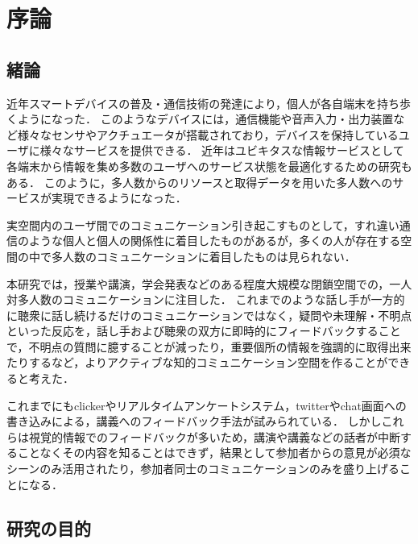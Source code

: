 \chapter{序論}


\section{緒論}





近年スマートデバイスの普及・通信技術の発達により，個人が各自端末を持ち歩くようになった．
このようなデバイスには，通信機能や音声入力・出力装置など様々なセンサやアクチュエータが搭載されており，デバイスを保持しているユーザに様々なサービスを提供できる．
近年はユビキタスな情報サービスとして各端末から情報を集め多数のユーザへのサービス状態を最適化するための研究もある\cite{11ubi}．
このように，多人数からのリソースと取得データを用いた多人数へのサービスが実現できるようになった．


実空間内のユーザ間でのコミュニケーション引き起こすものとして，すれ違い通信\cite{surechigai}のような個人と個人の関係性に着目したものがあるが，多くの人が存在する空間の中で多人数のコミュニケーションに着目したものは見られない．

本研究では，授業や講演，学会発表などのある程度大規模な閉鎖空間での，一人対多人数のコミュニケーションに注目した．
これまでのような話し手が一方的に聴衆に話し続けるだけのコミュニケーションではなく，疑問や未理解・不明点といった反応を，話し手および聴衆の双方に即時的にフィードバックすることで，不明点の質問に臆することが減ったり，重要個所の情報を強調的に取得出来たりするなど，よりアクティブな知的コミュニケーション空間を作ることができると考えた．

これまでにもclicker\cite{clicker}やリアルタイムアンケートシステム\cite{imakiku}，twitterやchat画面への書き込みによる\cite{twitter}，講義へのフィードバック手法が試みられている．
しかしこれらは視覚的情報でのフィードバックが多いため，講演や講義などの話者が中断することなくその内容を知ることはできず，結果として参加者からの意見が必須なシーンのみ活用されたり，参加者同士のコミュニケーションのみを盛り上げることになる．


\section{研究の目的}

